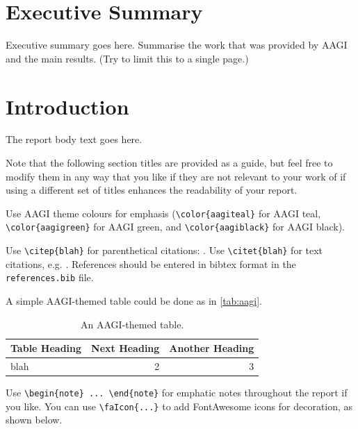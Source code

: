 \documentclass[12pt]{article}
\begin{document}
  \clearpage
  \section*{Executive Summary}
  Executive summary goes here. Summarise the work that was provided by AAGI and
  the main results. (Try to limit this to a single page.)

  \pagestyle{fancy}

  \clearpage
  \section{Introduction}
  
  The report body text goes here.
  
  Note that the following section titles are provided as a guide, but feel free
  to modify them in any way that you like if they are not relevant to your work
  of if using a different set of titles enhances the readability of your report.
  
  Use AAGI theme colours for emphasis (\verb|\color{aagiteal}|
  for {\color{aagiteal}AAGI teal}, \verb|\color{aagigreen}| for
  {\color{aagigreen}AAGI green}, and \verb|\color{aagiblack}| for
  {\color{aagiblack}AAGI black}).
  
  Use \verb|\citep{blah}| for parenthetical
  citations: \citep{blah}. Use \verb|\citet{blah}| for text citations, e.g.
  \citet{blah}. References should be entered in bibtex format in the
  \texttt{references.bib} file.
  
  A simple AAGI-themed table could be done as in \autoref{tab:aagi}.
  \begin{table}[h]
    \caption{An AAGI-themed table.}\label{tab:aagi}
    \centering
    \begin{tabular}{| l | r r |}
    \rowcolor{aagiteal} {\color{white}Table Heading} & %
    {\color{white}Next Heading} & {\color{white}Another Heading} \\
    \hline
    blah & 2 & 3 \\
    \hline
    \end{tabular}
  \end{table}
  
  Use \verb|\begin{note} ... \end{note}| for emphatic notes throughout
  the report if you like. You can use \verb|\faIcon{...}| to add 
  FontAwesome icons
  for decoration, as shown below.
  
\end{document}
